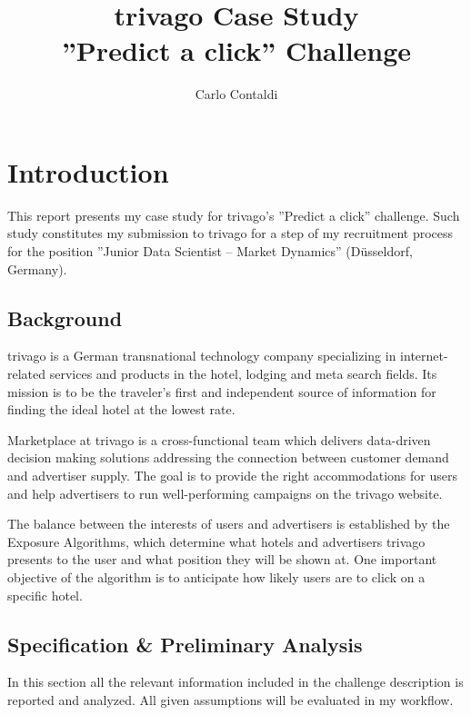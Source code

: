 \documentclass[preprint,12pt,3p]{elsarticle}
\begin{document}
\begin{frontmatter}

\title{trivago Case Study\\''Predict a click'' Challenge}

\author{Carlo Contaldi}
\address{contaldicarlo@gmail.com}
\address{www.linkedin.com/in/carlocontaldi/}
\address{github.com/carlocontaldi/trivago\_case\_study}

\end{frontmatter}


\section{Introduction}
This report presents my case study for trivago's ''Predict a click'' challenge. Such study constitutes my submission to trivago for a step of my recruitment process for the position ''Junior Data Scientist – Market Dynamics'' (D\"usseldorf, Germany).

\subsection{Background}
trivago is a German transnational technology company specializing in internet-related services and products in the hotel, lodging and meta search fields. Its mission is to be the traveler's first and independent source of information for finding the ideal hotel at the lowest rate.

Marketplace at trivago is a cross-functional team which delivers data-driven decision making solutions addressing the connection between customer demand and advertiser supply. The goal is to provide the right accommodations for users and help advertisers to run well-performing campaigns on the trivago website.

The balance between the interests of users and advertisers is established by the Exposure Algorithms, which determine what hotels and advertisers trivago presents to the user and what position they will be shown at. One important objective of the algorithm is to anticipate how likely users are to click on a specific hotel.

\subsection{Specification \& Preliminary Analysis}
In this section all the relevant information included in the challenge description is reported and analyzed. All given assumptions will be evaluated in my workflow.
\end{document}
